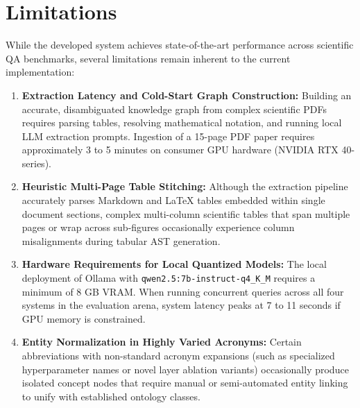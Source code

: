 \section{Limitations}
\label{sec:limitations}
While the developed system achieves state-of-the-art performance across scientific QA benchmarks, several limitations remain inherent to the current implementation:
\begin{enumerate}
    \item \textbf{Extraction Latency and Cold-Start Graph Construction:} Building an accurate, disambiguated knowledge graph from complex scientific PDFs requires parsing tables, resolving mathematical notation, and running local LLM extraction prompts. Ingestion of a 15-page PDF paper requires approximately 3 to 5 minutes on consumer GPU hardware (NVIDIA RTX 40-series).
    \item \textbf{Heuristic Multi-Page Table Stitching:} Although the extraction pipeline accurately parses Markdown and LaTeX tables embedded within single document sections, complex multi-column scientific tables that span multiple pages or wrap across sub-figures occasionally experience column misalignments during tabular AST generation.
    \item \textbf{Hardware Requirements for Local Quantized Models:} The local deployment of Ollama with \texttt{qwen2.5:7b-instruct-q4\_K\_M} requires a minimum of 8 GB VRAM. When running concurrent queries across all four systems in the evaluation arena, system latency peaks at 7 to 11 seconds if GPU memory is constrained.
    \item \textbf{Entity Normalization in Highly Varied Acronyms:} Certain abbreviations with non-standard acronym expansions (such as specialized hyperparameter names or novel layer ablation variants) occasionally produce isolated concept nodes that require manual or semi-automated entity linking to unify with established ontology classes.
\end{enumerate}

